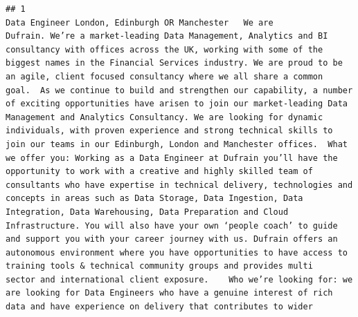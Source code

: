 \documentclass[
]{article}
\begin{document}
\begin{verbatim}
## 1                                                                                                                                                                                                                                                                                                                                                                                                                                                                                                                                                                                                                                                                                                                                                                                                                                                                                                                                                                                                                                                                                                                                                                                                                                                                                                                                                                                                                                                                                                                                                                                                                                                                                                                                                                                                                                                                                                                             Data Engineer London, Edinburgh OR Manchester   We are Dufrain. We’re a market-leading Data Management, Analytics and BI consultancy with offices across the UK, working with some of the biggest names in the Financial Services industry. We are proud to be an agile, client focused consultancy where we all share a common goal.  As we continue to build and strengthen our capability, a number of exciting opportunities have arisen to join our market-leading Data Management and Analytics Consultancy. We are looking for dynamic individuals, with proven experience and strong technical skills to join our teams in our Edinburgh, London and Manchester offices.  What we offer you: Working as a Data Engineer at Dufrain you’ll have the opportunity to work with a creative and highly skilled team of consultants who have expertise in technical delivery, technologies and concepts in areas such as Data Storage, Data Ingestion, Data Integration, Data Warehousing, Data Preparation and Cloud Infrastructure. You will also have your own ‘people coach’ to guide and support you with your career journey with us. Dufrain offers an autonomous environment where you have opportunities to have access to training tools & technical community groups and provides multi sector and international client exposure.    Who we’re looking for: we are looking for Data Engineers who have a genuine interest of rich data and have experience on delivery that contributes to wider 
\end{verbatim}
\end{document}
